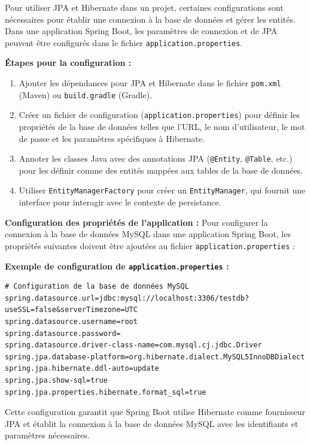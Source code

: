\documentclass{article}
\begin{document}
Pour utiliser JPA et Hibernate dans un projet, certaines configurations sont nécessaires pour établir une connexion à la base de données et gérer les entités. Dans une application Spring Boot, les paramètres de connexion et de JPA peuvent être configurés dans le fichier \texttt{application.properties}.

\textbf{Étapes pour la configuration :}
\begin{enumerate}
    \item Ajouter les dépendances pour JPA et Hibernate dans le fichier \texttt{pom.xml} (Maven) ou \texttt{build.gradle} (Gradle).
    \item Créer un fichier de configuration (\texttt{application.properties}) pour définir les propriétés de la base de données telles que l'URL, le nom d'utilisateur, le mot de passe et les paramètres spécifiques à Hibernate.
    \item Annoter les classes Java avec des annotations JPA (\texttt{@Entity}, \texttt{@Table}, etc.) pour les définir comme des entités mappées aux tables de la base de données.
    \item Utiliser \texttt{EntityManagerFactory} pour créer un \texttt{EntityManager}, qui fournit une interface pour interagir avec le contexte de persistance.
\end{enumerate}

\textbf{Configuration des propriétés de l'application :}
Pour configurer la connexion à la base de données MySQL dans une application Spring Boot, les propriétés suivantes doivent être ajoutées au fichier \texttt{application.properties} :

\textbf{Exemple de configuration de \texttt{application.properties} :}

\begin{lstlisting}[language=properties]
# Configuration de la base de données MySQL
spring.datasource.url=jdbc:mysql://localhost:3306/testdb?useSSL=false&serverTimezone=UTC
spring.datasource.username=root
spring.datasource.password=
spring.datasource.driver-class-name=com.mysql.cj.jdbc.Driver
spring.jpa.database-platform=org.hibernate.dialect.MySQL5InnoDBDialect
spring.jpa.hibernate.ddl-auto=update
spring.jpa.show-sql=true
spring.jpa.properties.hibernate.format_sql=true
\end{lstlisting}

Cette configuration garantit que Spring Boot utilise Hibernate comme fournisseur JPA et établit la connexion à la base de données MySQL avec les identifiants et paramètres nécessaires.
\end{document}
